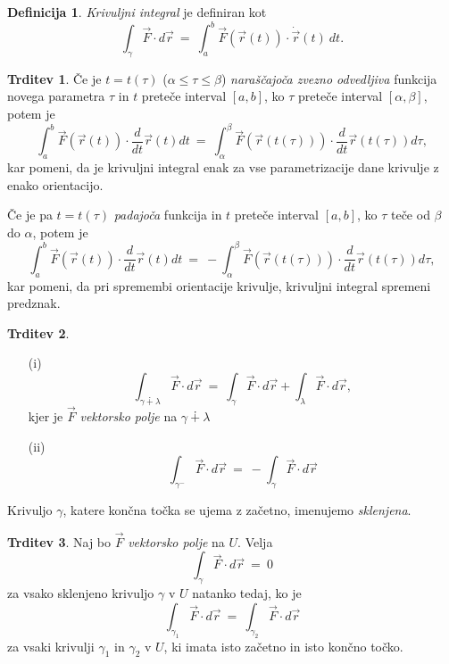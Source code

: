 \documentclass[11pt]{article}
\theoremstyle{definition}
\newtheorem{definicija}{Definicija}[section]
\theoremstyle{definition}
\newtheorem{trditev}{Trditev}[section]
\theoremstyle{definition}
\begin{document}
\begin{definicija}

\textit{Krivuljni integral} je definiran kot
$$\int_{\gamma} \vec{F} \cdot d\vec{r} ~=~ \int_{a}^{b} \vec{F}(\vec{r}(t)) \cdot \dot{\vec{r}}(t) ~dt.$$

\end{definicija}
\vspace{0.5cm}

\begin{trditev}

Če je $t = t(\tau)$ ($\alpha \leq \tau \leq \beta$) \textit{naraščajoča zvezno odvedljiva} funkcija novega parametra $\tau$ in $t$ preteče interval $[a, b]$, ko $\tau$ preteče interval $[\alpha, \beta]$, potem je
$$\int_a^b \vec{F}(\vec{r}(t)) \cdot \frac{d}{dt}\vec{r}(t) dt ~=~ \int_{\alpha}^{\beta} \vec{F}(\vec{r}(t(\tau))) \cdot \frac{d}{dt}\vec{r}(t(\tau)) d\tau,$$
kar pomeni, da je krivuljni integral enak za vse parametrizacije dane krivulje z enako orientacijo. 

\noindent Če je pa $t = t(\tau)$ \textit{padajoča} funkcija in $t$ preteče interval $[a, b]$, ko $\tau$ teče od $\beta$ do $\alpha$, potem je
$$\int_a^b \vec{F}(\vec{r}(t)) \cdot \frac{d}{dt}\vec{r}(t) dt ~=~ -\int_{\alpha}^{\beta} \vec{F}(\vec{r}(t(\tau))) \cdot \frac{d}{dt}\vec{r}(t(\tau)) d\tau,$$
kar pomeni, da pri spremembi orientacije krivulje, krivuljni integral spremeni predznak.

\end{trditev}
\vspace{0.5cm}

\begin{trditev}
~
\begin{enumerate}
\item[(i)] $$\int_{\gamma \dotplus \lambda} \vec{F} \cdot d\vec{r} ~=~ \int_{\gamma} \vec{F} \cdot d\vec{r} + \int_{\lambda} \vec{F} \cdot d\vec{r},$$
kjer je $\vec{F}$ \textit{vektorsko polje} na $\gamma \dotplus \lambda$
\item[(ii)] $$\int_{\gamma^-} \vec{F} \cdot d\vec{r} ~=~ -\int_{\gamma} \vec{F} \cdot d\vec{r}$$
\end{enumerate}
Krivuljo $\gamma$, katere končna točka se ujema z začetno, imenujemo \textit{sklenjena}.

\end{trditev}
\vspace{0.5cm}

\begin{trditev}

Naj bo $\vec{F}$ \textit{vektorsko polje} na $U$. Velja
$$\int_{\gamma} \vec{F} \cdot d\vec{r} ~=~ 0$$
za vsako sklenjeno krivuljo $\gamma$ v $U$ natanko tedaj, ko je 
$$\int_{\gamma_1} \vec{F} \cdot d\vec{r} ~=~ \int_{\gamma_2} \vec{F} \cdot d\vec{r}$$
za vsaki krivulji $\gamma_1$ in $\gamma_2$ v $U$, ki imata isto začetno in isto končno točko.

\end{trditev}
\vspace{0.5cm}
\end{document}
